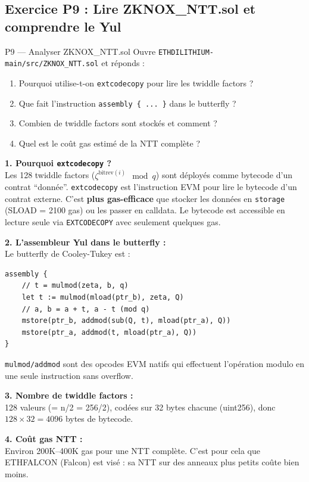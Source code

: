 \documentclass[12pt, a4paper]{article}
\begin{document}
\subsection{Exercice P9 : Lire ZKNOX\_NTT.sol et comprendre le Yul}

\begin{exercice}{P9 --- Analyser ZKNOX\_NTT.sol}
Ouvre \texttt{ETHDILITHIUM-main/src/ZKNOX\_NTT.sol} et réponds :
\begin{enumerate}
  \item Pourquoi utilise-t-on \texttt{extcodecopy} pour lire les twiddle factors ?
  \item Que fait l'instruction \texttt{assembly \{ ... \}} dans le butterfly ?
  \item Combien de twiddle factors sont stockés et comment ?
  \item Quel est le coût gas estimé de la NTT complète ?
\end{enumerate}
\end{exercice}

\begin{solution}
\begin{tcolorbox}[colback=suva_blue!5, colframe=suva_blue!40, breakable]
\textbf{1. Pourquoi \texttt{extcodecopy} ?}\\
Les 128 twiddle factors ($\zeta^{\text{bitrev}(i)} \mod q$) sont déployés comme bytecode d'un contrat ``donnée''. \texttt{extcodecopy} est l'instruction EVM pour lire le bytecode d'un contrat externe. C'est \textbf{plus gas-efficace} que stocker les données en \texttt{storage} (SLOAD = 2100 gas) ou les passer en calldata. Le bytecode est accessible en lecture seule via \texttt{EXTCODECOPY} avec seulement quelques gas.

\textbf{2. L'assembleur Yul dans le butterfly :}\\
Le butterfly de Cooley-Tukey est :
\begin{lstlisting}[style=solidity]
assembly {
    // t = mulmod(zeta, b, q)
    let t := mulmod(mload(ptr_b), zeta, Q)
    // a, b = a + t, a - t (mod q)
    mstore(ptr_b, addmod(sub(Q, t), mload(ptr_a), Q))
    mstore(ptr_a, addmod(t, mload(ptr_a), Q))
}
\end{lstlisting}
\texttt{mulmod/addmod} sont des opcodes EVM natifs qui effectuent l'opération modulo en une seule instruction sans overflow.

\textbf{3. Nombre de twiddle factors :}\\
128 valeurs (= n/2 = 256/2), codées sur 32 bytes chacune (uint256), donc $128 \times 32 = 4096$ bytes de bytecode.

\textbf{4. Coût gas NTT :}\\
Environ 200K--400K gas pour une NTT complète. C'est pour cela que ETHFALCON (Falcon) est visé : sa NTT sur des anneaux plus petits coûte bien moins.
\end{tcolorbox}
\end{solution}
\end{document}

